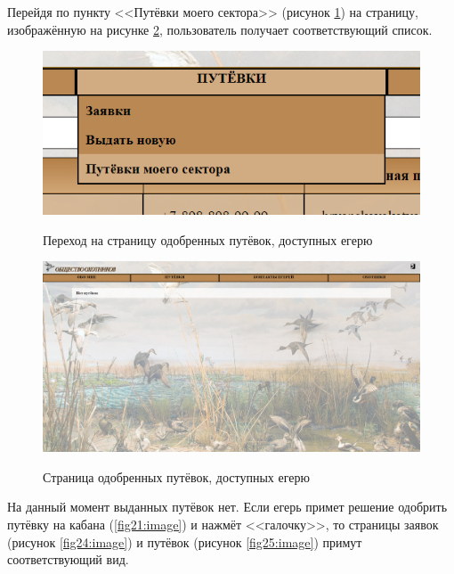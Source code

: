 	Перейдя по пункту <<Путёвки моего сектора>> (рисунок \ref{fig22:image}) на страницу, изображённую на рисунке \ref{fig23:image}, пользователь получает соответствующий список.
	
	\begin{figure}[h]
		\centering
		\begin{center}
			{\includegraphics[scale=0.5]{schemes/screens/vouchers_huntsman.png}}
			\caption{Переход на страницу одобренных путёвок, доступных егерю}
			\label{fig22:image}
		\end{center}
	\end{figure}

	\begin{figure}[h]
		\centering
		\begin{center}
			{\includegraphics[scale=0.34]{schemes/screens/vouchers_huntsman2.png}}
			\caption{Страница одобренных путёвок, доступных егерю}
			\label{fig23:image}
		\end{center}
	\end{figure}
	\newpage

	На данный момент выданных путёвок нет. Если егерь примет решение одобрить путёвку на кабана (\ref{fig21:image}) и нажмёт <<галочку>>, то страницы заявок (рисунок \ref{fig24:image}) и путёвок (рисунок \ref{fig25:image}) примут соответствующий вид.
	
